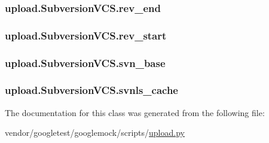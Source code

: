 \subsubsection[{\texorpdfstring{rev\+\_\+end}{rev_end}}]{\setlength{\rightskip}{0pt plus 5cm}upload.\+Subversion\+V\+C\+S.\+rev\+\_\+end}\hypertarget{classupload_1_1SubversionVCS_ac0bb07a099c722b7f8622de4b225904f}{}\label{classupload_1_1SubversionVCS_ac0bb07a099c722b7f8622de4b225904f}
\subsubsection[{\texorpdfstring{rev\+\_\+start}{rev_start}}]{\setlength{\rightskip}{0pt plus 5cm}upload.\+Subversion\+V\+C\+S.\+rev\+\_\+start}\hypertarget{classupload_1_1SubversionVCS_ad1553a69f4a790309273dbdeb9077732}{}\label{classupload_1_1SubversionVCS_ad1553a69f4a790309273dbdeb9077732}
\subsubsection[{\texorpdfstring{svn\+\_\+base}{svn_base}}]{\setlength{\rightskip}{0pt plus 5cm}upload.\+Subversion\+V\+C\+S.\+svn\+\_\+base}\hypertarget{classupload_1_1SubversionVCS_a60645c40d2fea4cd52881576bd13341f}{}\label{classupload_1_1SubversionVCS_a60645c40d2fea4cd52881576bd13341f}
\subsubsection[{\texorpdfstring{svnls\+\_\+cache}{svnls_cache}}]{\setlength{\rightskip}{0pt plus 5cm}upload.\+Subversion\+V\+C\+S.\+svnls\+\_\+cache}\hypertarget{classupload_1_1SubversionVCS_aa801782f807674b06f491df5d7ca9942}{}\label{classupload_1_1SubversionVCS_aa801782f807674b06f491df5d7ca9942}


The documentation for this class was generated from the following file\+:\begin{DoxyCompactItemize}
\item 
vendor/googletest/googlemock/scripts/\hyperlink{googlemock_2scripts_2upload_8py}{upload.\+py}\end{DoxyCompactItemize}
